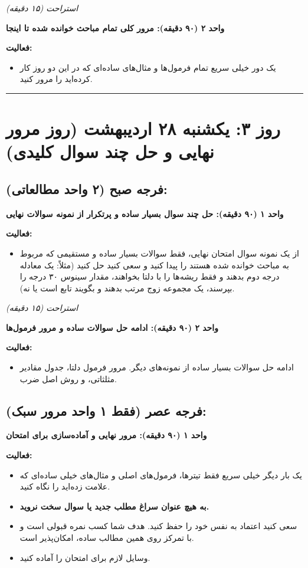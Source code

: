 \documentclass[12pt,a4paper]{article}
\newcommand{\studyunit}[1]{\par\medskip\noindent\textbf{#1}\par\nopagebreak}
\newcommand{\activities}{\par\medskip\noindent\textbf{فعالیت:}\begin{itemize}[nosep,after=\vspace{-0.5\baselineskip}]}
\newcommand{\breaktime}[1]{\par\smallskip\centerline{\textit{#1}}\smallskip}
\begin{document}
    \breaktime{استراحت (۱۵ دقیقه)}

    \studyunit{واحد ۲ (۹۰ دقیقه): مرور کلی تمام مباحث خوانده شده تا اینجا}
        \activities
            \item یک دور خیلی سریع تمام فرمول‌ها و مثال‌های ساده‌ای که در این دو روز کار کرده‌اید را مرور کنید.
        \end{itemize}

\rule{\linewidth}{0.4pt}\vspace{1em}

\section*{روز ۳: یکشنبه ۲۸ اردیبهشت (روز مرور نهایی و حل چند سوال کلیدی)}

\subsection*{فرجه صبح (۲ واحد مطالعاتی):}
    \studyunit{واحد ۱ (۹۰ دقیقه): حل چند سوال بسیار ساده و پرتکرار از نمونه سوالات نهایی}
        \activities
            \item از یک نمونه سوال امتحان نهایی، فقط سوالات بسیار ساده و مستقیمی که مربوط به مباحث خوانده شده هستند را پیدا کنید و سعی کنید حل کنید (مثلاً: یک معادله درجه دوم بدهند و فقط ریشه‌ها را با دلتا بخواهند، مقدار سینوس ۳۰ درجه را بپرسند، یک مجموعه زوج مرتب بدهند و بگویند تابع است یا نه).
        \end{itemize}

    \breaktime{استراحت (۱۵ دقیقه)}

    \studyunit{واحد ۲ (۹۰ دقیقه): ادامه حل سوالات ساده و مرور فرمول‌ها}
        \activities
            \item ادامه حل سوالات بسیار ساده از نمونه‌های دیگر. مرور فرمول دلتا، جدول مقادیر مثلثاتی، و روش اصل ضرب.
        \end{itemize}

\subsection*{فرجه عصر (فقط ۱ واحد مرور سبک):}
    \studyunit{واحد ۱ (۹۰ دقیقه): مرور نهایی و آماده‌سازی برای امتحان}
        \activities
            \item یک بار دیگر خیلی سریع فقط تیترها، فرمول‌های اصلی و مثال‌های خیلی ساده‌ای که علامت زده‌اید را نگاه کنید.
            \item \textbf{به هیچ عنوان سراغ مطلب جدید یا سوال سخت نروید.}
            \item سعی کنید اعتماد به نفس خود را حفظ کنید. هدف شما کسب نمره قبولی است و با تمرکز روی همین مطالب ساده، امکان‌پذیر است.
            \item وسایل لازم برای امتحان را آماده کنید.
        \end{itemize}
\end{document}
